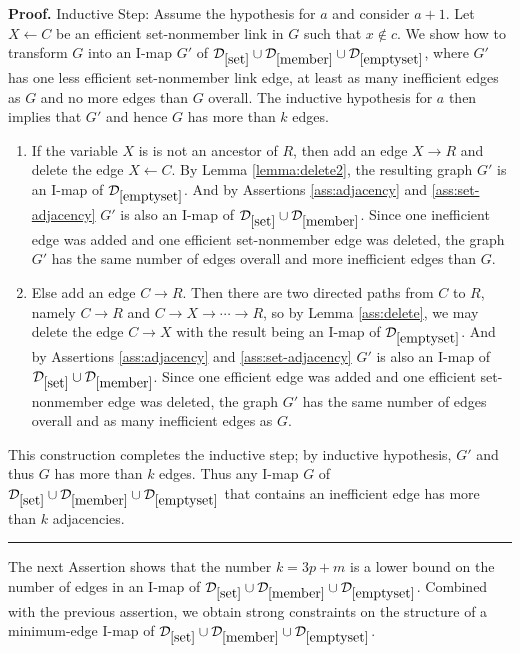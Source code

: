 \documentclass{elsarticle}%
\renewenvironment{proof}[1][Proof]{\noindent\textbf{#1.} }{\ \rule{0.5em}{0.5em}}
\newcommand{\R}{R}
\newcommand{\X}{X}
\newcommand{\Y}{Y}
\newcommand{\C}{C}
\newcommand{\G}{G}
\newcommand{\D}{\mathcal{D}}
\renewcommand{\c}{c}
\newcommand{\x}{x}
\begin{document}
\begin{proof}
Inductive Step: Assume the hypothesis for $a$ and consider $a+1$. Let $\X \leftarrow \C$ be an efficient set-nonmember link in $\G$ such that $\x \not\in \c$. We show how to transform $\G$ into an I-map $\G'$ of $\D_{\ref{set}}\cup \D_{\ref{member}}\cup
\D_{\ref{emptyset}}$, where $\G'$ has one less efficient set-nonmember link edge, at least as many inefficient edges as  $\G$ and no more edges than $\G$ overall. The inductive hypothesis for $a$ then implies that $\G'$ and hence $\G$ has more than $k$ edges.  
\begin{enumerate}
\item If the variable $\X$ is is not an ancestor of $\R$, then add an edge $\X \rightarrow \R$ and delete the edge $\X \leftarrow \C$. By Lemma \ref{lemma:delete2}, the resulting graph $\G'$ is an I-map  of $\D_{\ref{emptyset}}$. And by Assertions \ref{ass:adjacency} and \ref{ass:set-adjacency} $\G'$ is also an I-map of $\D_{\ref{set}}\cup \D_{\ref{member}}$. Since one inefficient edge was added and one efficient set-nonmember edge was deleted, the graph $\G'$ has the same number of edges overall and more inefficient edges than $\G$.
\item Else add an edge $\C \rightarrow \R$. Then there are two directed paths from $\C$ to $\R$, namely $\C \rightarrow \R$ and $\C \rightarrow \X \rightarrow \cdots \rightarrow \R$, so by Lemma \ref{ass:delete}, we may delete the edge $\C \rightarrow \X$ with the result being an I-map of $\D_{\ref{emptyset}}$. And by Assertions \ref{ass:adjacency} and \ref{ass:set-adjacency} $\G'$ is also an I-map of $\D_{\ref{set}}\cup \D_{\ref{member}}$. Since one efficient edge was added and one efficient set-nonmember edge was deleted, the graph $\G'$ has the same number of edges overall and as many inefficient edges as $\G$.
\end{enumerate}
This construction completes the inductive step; by inductive hypothesis, $\G'$ and thus $\G$ has more than $k$ edges. Thus any I-map $\G$ of $\D_{\ref{set}}\cup \D_{\ref{member}}\cup
\D_{\ref{emptyset}}$ that contains an inefficient edge has more than $k$ adjacencies.
\end{proof}
%
% 
%
The next Assertion shows that the number $k = 3p +m$ is a lower bound on the number of edges in an I-map of $\D_{\ref{set}}\cup \D_{\ref{member}}\cup
\D_{\ref{emptyset}}$. Combined with the previous assertion, we obtain strong constraints on the structure  of a minimum-edge I-map of $\D_{\ref{set}}\cup \D_{\ref{member}}\cup
\D_{\ref{emptyset}}$.
\end{document}
